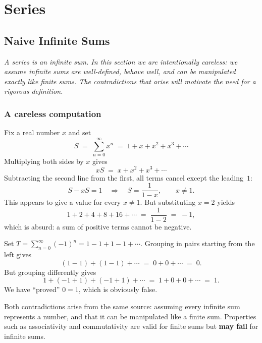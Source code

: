 \chapter{Series}

\section{Naive Infinite Sums}
\label{sec:13.1}

\textit{A series is an infinite sum.  In this section we are intentionally careless: we assume infinite sums are well-defined, behave well, and can be manipulated exactly like finite sums.  The contradictions that arise will motivate the need for a rigorous definition.}

\subsection*{A careless computation}

\begin{example}
\label{ex:13-1}
Fix a real number $x$ and set
\[
  S \;=\; \sum_{n=0}^{\infty} x^{n} \;=\; 1 + x + x^{2} + x^{3} + \cdots
\]
Multiplying both sides by $x$ gives
\[
  xS \;=\; x + x^{2} + x^{3} + \cdots
\]
Subtracting the second line from the first, all terms cancel except the leading~$1$:
\[
  S - xS = 1 \quad\Longrightarrow\quad S = \frac{1}{1-x}, \qquad x\neq 1.
\]
This appears to give a value for every $x\neq 1$.  But substituting $x=2$ yields
\[
  1 + 2 + 4 + 8 + 16 + \cdots \;=\; \frac{1}{1-2} \;=\; -1,
\]
which is absurd: a sum of positive terms cannot be negative.
\end{example}

\begin{example}
\label{ex:13-2}
Set $T = \sum_{n=0}^{\infty}(-1)^{n} = 1 - 1 + 1 - 1 + \cdots$.  Grouping in pairs starting from the left gives
\[
  (1-1) + (1-1) + \cdots \;=\; 0+0+\cdots \;=\; 0.
\]
But grouping differently gives
\[
  1 + (-1+1) + (-1+1) + \cdots \;=\; 1 + 0 + 0 + \cdots \;=\; 1.
\]
We have ``proved'' $0 = 1$, which is obviously false.
\end{example}

\begin{remark}[Warning]
Both contradictions arise from the same source: assuming every infinite sum represents a number, and that it can be manipulated like a finite sum.  Properties such as associativity and commutativity are valid for finite sums but \textbf{may fail} for infinite sums.
\end{remark}

